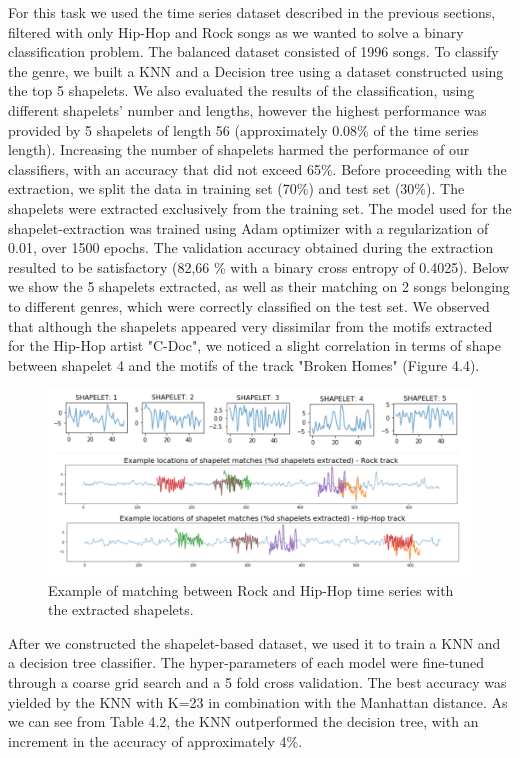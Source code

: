 For this task we used the time series dataset described in the previous sections, filtered with only Hip-Hop and Rock songs as we wanted to solve a binary classification problem. The balanced dataset consisted of 1996 songs. To classify the genre, we built a KNN and a Decision tree using a dataset constructed using the top 5 shapelets.
We also evaluated the results of the classification, using different shapelets' number and lengths, however the highest performance was provided by 5 shapelets of length 56 (approximately 0.08\% of the time series length). Increasing the number of shapelets harmed the performance of our classifiers, with an accuracy that did not exceed 65\%. 
Before proceeding with the extraction, we split the data in training set (70\%) and test set (30\%). The shapelets were extracted exclusively from the training set. 
The model used for the shapelet-extraction was trained using Adam optimizer with a regularization of 0.01, over 1500 epochs. The validation accuracy obtained during the extraction resulted to be satisfactory (82,66 \% with a binary cross entropy of 0.4025). Below we show the 5 shapelets extracted, as well as their matching on 2 songs belonging to different genres, which were correctly classified on the test set. We observed that although the shapelets appeared very dissimilar from the motifs extracted for the Hip-Hop artist "C-Doc", we noticed a slight correlation in terms of shape between shapelet 4 and the motifs of the track "Broken Homes" (Figure 4.4). 

\begin{figure}[!htb]
  \centering
  \includegraphics[width=0.85\linewidth]{images/shapelets.png}
  \caption{Example of matching between Rock and Hip-Hop time series with the extracted shapelets.}
\end{figure}

After we constructed the shapelet-based dataset, we used it to train a KNN and a decision tree classifier. The hyper-parameters of each model were fine-tuned through a coarse grid search and a 5 fold cross validation. The best accuracy was yielded by the KNN with K=23 in combination with the Manhattan distance. As we can see from Table 4.2, the KNN outperformed the decision tree, with an increment in the accuracy of approximately 4\%.


